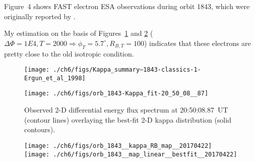 
  Figure~4 shows FAST electron ESA observations during orbit 1843,
  which were originally reported by \citet{Ergun1998a}. 

  My estimation on the basis of Figures~\ref{ch6:Fig4} and \ref{ch6:Fig5}
  ($\Delta \Phi = 1E4, T = 2000 \Rightarrow \phi_T = 5.7^\circ,
  R_{B,T} = 100$) indicates that these electrons are pretty close to
  the old isotropic condition.


  \begin{figure}
    \centering
    \noindent\texttt{[image: ./ch6/figs/Kappa\_summary--1843-classics-1-Ergun\_et\_al\_1998]}
    \caption{}
    \label{ch6:Fig4}
  \end{figure}



  \begin{figure}
    \centering
    \noindent\texttt{[image: ./ch6/figs/orb\_1843-Kappa\_fit-20\_50\_08\_\_87]}
    \caption{Observed 2-D differential energy flux spectrum at
      20:50:08.87~UT (contour lines) overlaying the best-fit 2-D kappa
      distribution (solid contours). }
    \label{ch6:Fig5}
  \end{figure}



  \begin{figure}
    \centering
    \noindent\texttt{[image: ./ch6/figs/orb\_1843\_\_kappa\_RB\_map\_\_20170422]}
    \noindent\texttt{[image: ./ch6/figs/orb\_1843\_\_map\_linear\_\_bestfit\_\_20170422]}
    \caption{}
    \label{ch6:Fig6}
  \end{figure}

